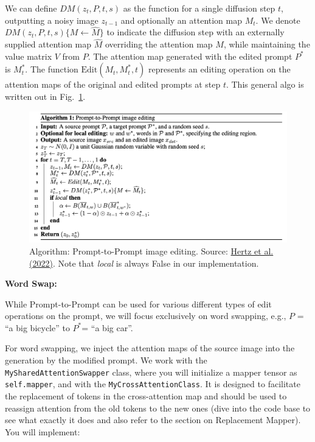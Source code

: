 \documentclass[11pt,addpoints,answers]{exam}
\begin{document}
\begin{questions}
We can define $DM(z_t, P, t, s)$ as the function for a single diffusion step $t$, outputting a noisy image $z_{t-1}$ and optionally an attention map $M_t$. We denote $DM(z_t, P, t, s)\{M \leftarrow \hat{M}\}$ to indicate the diffusion step with an externally supplied attention map $\hat{M}$ overriding the attention map \( M \), while maintaining the value matrix $V$ from $P$. The attention map generated with the edited prompt $P^*$ is $M_t^*$. The function $\text{Edit}(M_t, M_t^*, t)$ represents an editing operation on the attention maps of the original and edited prompts at step $t$. This general algo is written out in Fig.~\ref{fig:algo}.

    \begin{figure}[h!]
        \centering
        \includegraphics[width=.9\linewidth]{fig/algo.png}
        \caption{Algorithm: Prompt-to-Prompt image editing. Source: \href{https://arxiv.org/pdf/2208.01626.pdf}{Hertz et al. (2022)}. Note that \textit{local} is always False in our implementation. }
        \label{fig:algo}
    \end{figure}

\textbf{Word Swap:} 

While Prompt-to-Prompt can be used for various different types of edit operations on the prompt, we will focus exclusively on word swapping, e.g., \( P\) = “a
big bicycle” to \( P^* \)= “a big car”.

For word swapping, we inject the attention maps of the source image into the generation by the modified prompt. We work with the \lstinline{MySharedAttentionSwapper} class, where you will initialize a mapper tensor as \lstinline{self.mapper}, and with the \lstinline{MyCrossAttentionClass}. It is designed to facilitate the replacement of tokens in the cross-attention map and should be used to reassign attention from the old tokens to the new ones (dive into the code base to see what exactly it does and also refer to the section on Replacement Mapper). You will implement:


\end{questions}
\end{document}
